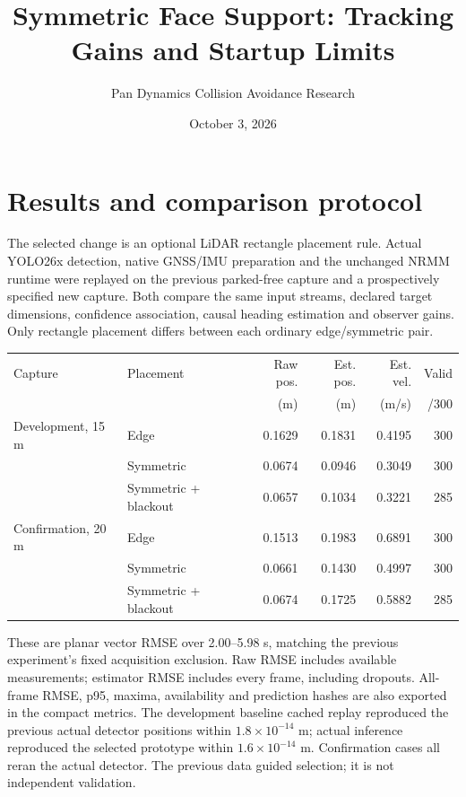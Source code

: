 \documentclass[11pt]{article}
\title{Symmetric Face Support: Tracking Gains and Startup Limits}
\author{Pan Dynamics Collision Avoidance Research}
\date{October 3, 2026}
\begin{document}
\maketitle
\section{Results and comparison protocol}
The selected change is an optional LiDAR rectangle placement rule. Actual
YOLO26x detection, native GNSS/IMU preparation and the unchanged NRMM runtime
were replayed on the previous parked-free capture and a prospectively specified
new capture. Both compare the same input streams, declared target dimensions,
confidence association, causal heading estimation and observer gains. Only
rectangle placement differs between each ordinary edge/symmetric pair.

\begin{center}\small
\begin{tabular}{@{}llrrrr@{}}\toprule
Capture & Placement & Raw pos. & Est. pos. & Est. vel. & Valid \\
 & & (m) & (m) & (m/s) & /300 \\\midrule
Development, 15 m & Edge & 0.1629 & 0.1831 & 0.4195 & 300 \\
 & Symmetric & 0.0674 & 0.0946 & 0.3049 & 300 \\
 & Symmetric + blackout & 0.0657 & 0.1034 & 0.3221 & 285 \\
Confirmation, 20 m & Edge & 0.1513 & 0.1983 & 0.6891 & 300 \\
 & Symmetric & 0.0661 & 0.1430 & 0.4997 & 300 \\
 & Symmetric + blackout & 0.0674 & 0.1725 & 0.5882 & 285 \\
\bottomrule\end{tabular}\end{center}

These are planar vector RMSE over 2.00--5.98 s, matching the previous
experiment's fixed acquisition exclusion. Raw RMSE includes available
measurements; estimator RMSE includes every frame, including dropouts.
All-frame RMSE, p95, maxima, availability and prediction hashes are also
exported in the compact metrics. The development baseline cached replay
reproduced the previous actual detector positions within $1.8\times10^{-14}$ m;
actual inference reproduced the selected prototype within
$1.6\times10^{-14}$ m. Confirmation cases all reran the actual detector.
The previous data guided selection; it is not independent validation.
\end{document}
